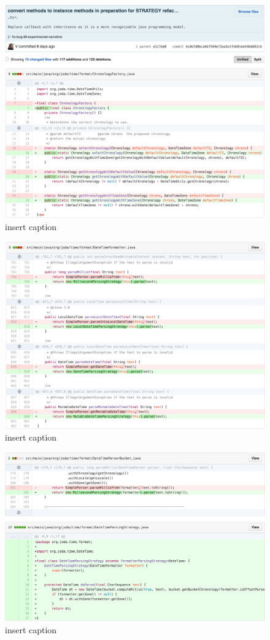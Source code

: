 \begin{figure}[H]
	\centering
	\includegraphics[width=\linewidth]{code102}
	\caption{insert caption}
\end{figure}
\begin{figure}[H]
	\centering
	\includegraphics[width=\linewidth]{code103}
	\caption{insert caption}
\end{figure}
\begin{figure}[H]
	\centering
	\includegraphics[width=\linewidth]{code104}
	\caption{insert caption}
\end{figure}
